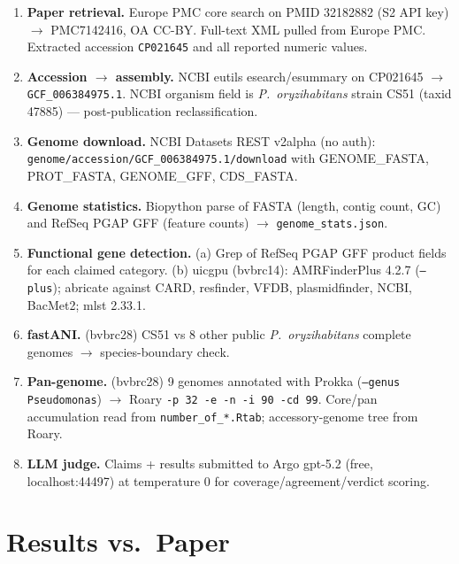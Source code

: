 \documentclass[11pt]{article}
\begin{document}
\begin{enumerate}[leftmargin=*]
\item \textbf{Paper retrieval.} Europe PMC core search on PMID 32182882 (S2 API
key) $\rightarrow$ PMC7142416, OA CC-BY. Full-text XML pulled from Europe PMC.
Extracted accession \texttt{CP021645} and all reported numeric values.

\item \textbf{Accession $\rightarrow$ assembly.} NCBI eutils esearch/esummary on
CP021645 $\rightarrow$ \texttt{GCF\_006384975.1}. NCBI organism field is
\textit{P.\ oryzihabitans} strain CS51 (taxid 47885) --- post-publication
reclassification.

\item \textbf{Genome download.} NCBI Datasets REST v2alpha (no auth):
\texttt{genome/accession/GCF\_006384975.1/download} with GENOME\_FASTA,
PROT\_FASTA, GENOME\_GFF, CDS\_FASTA.

\item \textbf{Genome statistics.} Biopython parse of FASTA (length, contig
count, GC) and RefSeq PGAP GFF (feature counts) $\rightarrow$
\texttt{genome\_stats.json}.

\item \textbf{Functional gene detection.} (a) Grep of RefSeq PGAP GFF product
fields for each claimed category. (b) uicgpu (bvbrc14): AMRFinderPlus 4.2.7
(\texttt{--plus}); abricate against CARD, resfinder, VFDB, plasmidfinder, NCBI,
BacMet2; mlst 2.33.1.

\item \textbf{fastANI.} (bvbrc28) CS51 vs 8 other public
\textit{P.\ oryzihabitans} complete genomes $\rightarrow$ species-boundary check.

\item \textbf{Pan-genome.} (bvbrc28) 9 genomes annotated with Prokka
(\texttt{--genus Pseudomonas}) $\rightarrow$ Roary
\texttt{-p 32 -e -n -i 90 -cd 99}. Core/pan accumulation read from
\texttt{number\_of\_*.Rtab}; accessory-genome tree from Roary.

\item \textbf{LLM judge.} Claims + results submitted to Argo gpt-5.2 (free,
localhost:44497) at temperature 0 for coverage/agreement/verdict scoring.
\end{enumerate}

\section{Results vs.\ Paper}
\end{document}
